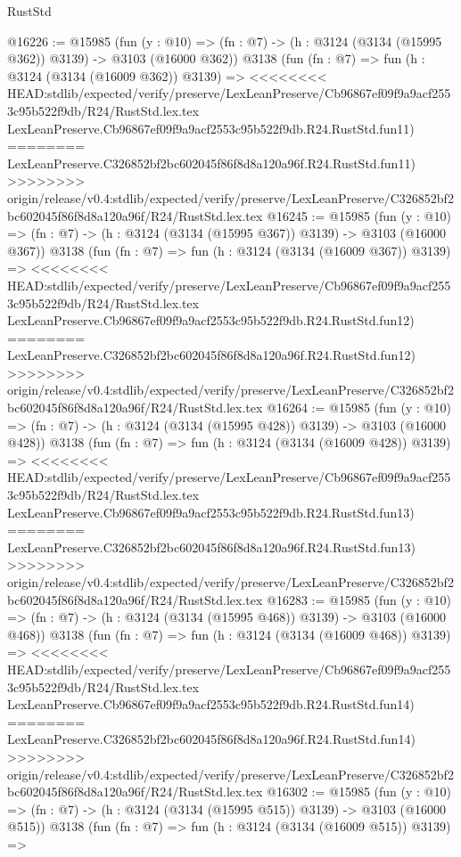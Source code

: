 \begin{lexlean}{RustStd}
\begin{coremodule}
{\begin{coremodule}
{{{{{{{{{{{{{{{{{{{{{{{{{{@16226 := @15985
    (fun (y : @10) => (fn : @7) -> (h : @3124 (@3134 (@15995 @362)) @3139) -> @3103 (@16000 @362))
    @3138
    (fun (fn : @7) =>
    fun (h : @3124 (@3134 (@16009 @362)) @3139) =>
<<<<<<<< HEAD:stdlib/expected/verify/preserve/LexLeanPreserve/Cb96867ef09f9a9acf2553c95b522f9db/R24/RustStd.lex.tex
    LexLeanPreserve.Cb96867ef09f9a9acf2553c95b522f9db.R24.RustStd.fun11)
========
    LexLeanPreserve.C326852bf2bc602045f86f8d8a120a96f.R24.RustStd.fun11)
>>>>>>>> origin/release/v0.4:stdlib/expected/verify/preserve/LexLeanPreserve/C326852bf2bc602045f86f8d8a120a96f/R24/RustStd.lex.tex
@16245 := @15985
    (fun (y : @10) => (fn : @7) -> (h : @3124 (@3134 (@15995 @367)) @3139) -> @3103 (@16000 @367))
    @3138
    (fun (fn : @7) =>
    fun (h : @3124 (@3134 (@16009 @367)) @3139) =>
<<<<<<<< HEAD:stdlib/expected/verify/preserve/LexLeanPreserve/Cb96867ef09f9a9acf2553c95b522f9db/R24/RustStd.lex.tex
    LexLeanPreserve.Cb96867ef09f9a9acf2553c95b522f9db.R24.RustStd.fun12)
========
    LexLeanPreserve.C326852bf2bc602045f86f8d8a120a96f.R24.RustStd.fun12)
>>>>>>>> origin/release/v0.4:stdlib/expected/verify/preserve/LexLeanPreserve/C326852bf2bc602045f86f8d8a120a96f/R24/RustStd.lex.tex
@16264 := @15985
    (fun (y : @10) => (fn : @7) -> (h : @3124 (@3134 (@15995 @428)) @3139) -> @3103 (@16000 @428))
    @3138
    (fun (fn : @7) =>
    fun (h : @3124 (@3134 (@16009 @428)) @3139) =>
<<<<<<<< HEAD:stdlib/expected/verify/preserve/LexLeanPreserve/Cb96867ef09f9a9acf2553c95b522f9db/R24/RustStd.lex.tex
    LexLeanPreserve.Cb96867ef09f9a9acf2553c95b522f9db.R24.RustStd.fun13)
========
    LexLeanPreserve.C326852bf2bc602045f86f8d8a120a96f.R24.RustStd.fun13)
>>>>>>>> origin/release/v0.4:stdlib/expected/verify/preserve/LexLeanPreserve/C326852bf2bc602045f86f8d8a120a96f/R24/RustStd.lex.tex
@16283 := @15985
    (fun (y : @10) => (fn : @7) -> (h : @3124 (@3134 (@15995 @468)) @3139) -> @3103 (@16000 @468))
    @3138
    (fun (fn : @7) =>
    fun (h : @3124 (@3134 (@16009 @468)) @3139) =>
<<<<<<<< HEAD:stdlib/expected/verify/preserve/LexLeanPreserve/Cb96867ef09f9a9acf2553c95b522f9db/R24/RustStd.lex.tex
    LexLeanPreserve.Cb96867ef09f9a9acf2553c95b522f9db.R24.RustStd.fun14)
========
    LexLeanPreserve.C326852bf2bc602045f86f8d8a120a96f.R24.RustStd.fun14)
>>>>>>>> origin/release/v0.4:stdlib/expected/verify/preserve/LexLeanPreserve/C326852bf2bc602045f86f8d8a120a96f/R24/RustStd.lex.tex
@16302 := @15985
    (fun (y : @10) => (fn : @7) -> (h : @3124 (@3134 (@15995 @515)) @3139) -> @3103 (@16000 @515))
    @3138
    (fun (fn : @7) =>
    fun (h : @3124 (@3134 (@16009 @515)) @3139) =>
}}}}}}}}}}}}}}}}}}}}}}}}}}
\end{coremodule}}
\end{coremodule}
\end{lexlean}
